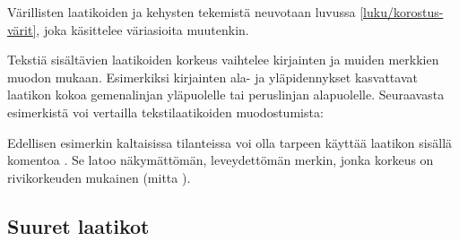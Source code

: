 \begin{koodilohkosis}
\setlength{\fboxsep}{3bp}
\setlength{\fboxrule}{.5bp}
\end{koodilohkosis}

\begin{tulossis}
  \setlength{\fboxsep}{3bp}
  \setlength{\fboxrule}{.5bp}
\end{tulossis}

\noindent
Värillisten laatikoiden ja kehysten tekemistä neuvotaan luvussa
\ref{luku/korostus-värit}, joka käsittelee väriasioita muutenkin.

Tekstiä sisältävien laatikoiden korkeus vaihtelee kirjainten ja muiden
merkkien muodon mukaan. Esimerkiksi kirjainten ala- ja yläpidennykset
kasvattavat laatikon kokoa gemenalinjan yläpuolelle tai peruslinjan
alapuolelle. Seuraavasta esimerkistä voi vertailla tekstilaatikoiden
muodostumista:

\begin{koodilohkosis}
\setlength{\fboxsep}{0bp}
  
\end{koodilohkosis}

\begin{tulossis}
  \setlength{\fboxsep}{0bp}
    
\end{tulossis}

\noindent
Edellisen esimerkin kaltaisissa tilanteissa voi olla tarpeen käyttää
laatikon sisällä komentoa . Se latoo näkymättömän,
leveydettömän merkin, jonka korkeus on rivikorkeuden mukainen (mitta
).

\begin{koodilohkosis}
\setlength{\fboxsep}{0bp}
  
\end{koodilohkosis}

\begin{tulossis}
  \setlength{\fboxsep}{0bp}
    
\end{tulossis}

\subsection{Suuret laatikot}
\label{luku/laatikot-isot}

